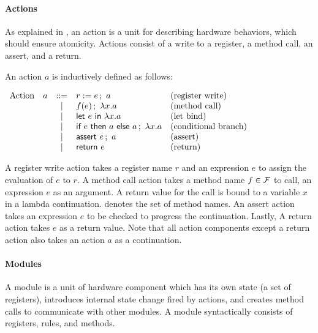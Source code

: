 \paragraph{Actions}
As explained in , an action is a unit for describing
hardware behaviors, which should ensure atomicity. Actions consist of
a write to a register, a method call, an assert, and a return.

\begin{definition}
  \label{def-action}
  An action $a$ is inductively defined as follows:
  \begin{center}
    \begin{math}
      \begin{array}{rcll}
        \textrm{Action}\quad a & ::= & \actwrite{r}{e}{a} & \textrm{(register write)} \\
        & | & \actcall{x}{f}{e}{a} & \textrm{(method call)} \\
        & | & \actlet{e}{x}{a} & \textrm{(let bind)} \\
        & | & \actifelse{e}{a}{a}{x}{a} & \textrm{(conditional branch)} \\
        & | & \actassert{e}{a} & \textrm{(assert)} \\
        & | & \actret{e} & \textrm{(return)} \\
      \end{array}
    \end{math}
  \end{center}
\end{definition}

A register write action takes a register name $r$ and an expression
$e$ to assign the evaluation of $e$ to $r$. A method call action takes
a method name $f \in \setmeths{}$ to call, an expression $e$ as an
argument. A return value for the call is bound to a variable $x$ in a
lambda continuation. \setmeths{} denotes the set of method names. An
assert action takes an expression $e$ to be checked to progress the
continuation. Lastly, A return action takes $e$ as a return
value. Note that all action components except a return action also
takes an action $a$ as a continuation.

\paragraph{Modules}
A module is a unit of hardware component which has its own state (a
set of registers), introduces internal state change fired by actions,
and creates method calls to communicate with other modules. A module
syntactically consists of registers, rules, and methods.

